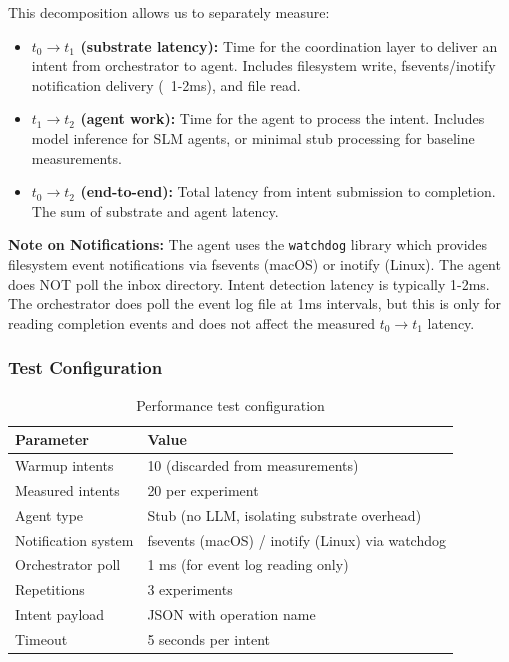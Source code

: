 \documentclass[11pt]{article}
\begin{document}
This decomposition allows us to separately measure:
\begin{itemize}
\item \textbf{$t_0 \rightarrow t_1$ (substrate latency):} Time for the coordination layer to deliver an intent from orchestrator to agent. Includes filesystem write, fsevents/inotify notification delivery (~1-2ms), and file read.
\item \textbf{$t_1 \rightarrow t_2$ (agent work):} Time for the agent to process the intent. Includes model inference for SLM agents, or minimal stub processing for baseline measurements.
\item \textbf{$t_0 \rightarrow t_2$ (end-to-end):} Total latency from intent submission to completion. The sum of substrate and agent latency.
\end{itemize}

\textbf{Note on Notifications:} The agent uses the \texttt{watchdog} library which provides filesystem event notifications via fsevents (macOS) or inotify (Linux). The agent does NOT poll the inbox directory. Intent detection latency is typically 1-2ms. The orchestrator does poll the event log file at 1ms intervals, but this is only for reading completion events and does not affect the measured $t_0 \rightarrow t_1$ latency.

\subsubsection{Test Configuration}

\begin{table}[h]
\centering
\begin{tabular}{ll}
\toprule
\textbf{Parameter} & \textbf{Value} \\
\midrule
Warmup intents & 10 (discarded from measurements) \\
Measured intents & 20 per experiment \\
Agent type & Stub (no LLM, isolating substrate overhead) \\
Notification system & fsevents (macOS) / inotify (Linux) via watchdog \\
Orchestrator poll & 1 ms (for event log reading only) \\
Repetitions & 3 experiments \\
Intent payload & JSON with operation name \\
Timeout & 5 seconds per intent \\
\bottomrule
\end{tabular}
\caption{Performance test configuration}
\end{table}
\end{document}
